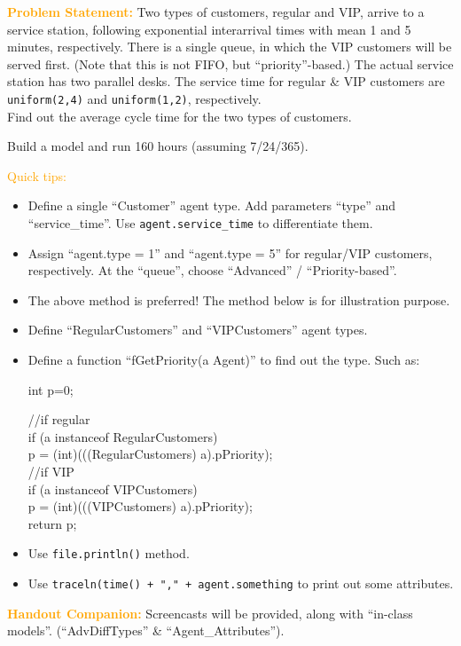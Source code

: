 \documentclass{article}
\begin{document}
\vskip 0.3in

\textcolor{orange}{\bf Problem Statement:}  Two types of customers, regular and VIP, arrive to a service station, following exponential interarrival times with mean 1 and 5 minutes, respectively.  There is a single queue, in which the VIP customers will be served first. (Note that this is not FIFO, but ``priority''-based.) The actual service station has two parallel desks. The service time for regular \& VIP customers are \texttt{uniform(2,4)} and \texttt{uniform(1,2)}, respectively.  \\

\vskip 0.2in
Find out the average cycle time for the two types of customers. 

\vskip 0.2in
Build a model and run 160 hours (assuming 7/24/365).

\vskip 0.2in \textcolor{orange}{Quick tips:}
\begin{itemize}
\item Define a single ``Customer'' agent type. Add parameters ``type'' and ``service\_time''. Use \texttt{agent.service\_time} to differentiate them. 
\item Assign ``agent.type = 1'' and ``agent.type = 5'' for regular/VIP customers, respectively. At the ``queue'', choose ``Advanced'' / ``Priority-based''. 
\item The above method is preferred! The method below is for illustration purpose.
\item Define ``RegularCustomers'' and ``VIPCustomers'' agent types. 
\item Define a function ``fGetPriority(a Agent)'' to find out the type. Such as: \\
\tt{int p=0; 

//if regular \\
if (a instanceof RegularCustomers) \\
   p =  (int)(((RegularCustomers) a).pPriority); \\
//if VIP \\   
if (a instanceof VIPCustomers)   \\
	p =  (int)(((VIPCustomers) a).pPriority);\\

return p;}
\end{itemize}
\begin{itemize}
\item Use \texttt{file.println()} method.
\item Use \texttt{traceln(time() + "," + agent.something} to print out some attributes. 
\end{itemize}

\vskip 0.3in
\textcolor{orange}{\bf Handout Companion:} Screencasts will be provided, along with ``in-class models''.  (``AdvDiffTypes'' \& ``Agent\_Attributes'').
\end{document}
